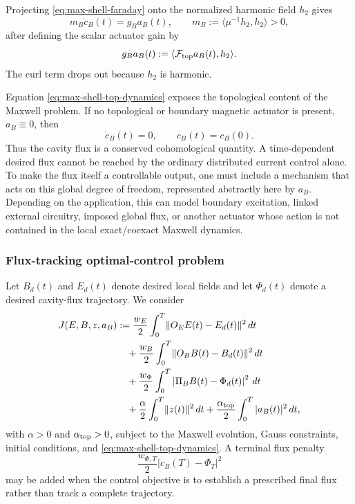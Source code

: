 \documentclass{article}
\newcommand{\ip}[2]{\langle #1,#2\rangle}
\newcommand{\norm}[1]{\lVert #1\rVert}
\begin{document}
Projecting \eqref{eq:max-shell-faraday} onto the normalized harmonic
field $h_2$ gives
\begin{equation}
  m_B \dot c_B(t)
  =
  g_B a_B(t),
  \qquad
  m_B:=\ip{\mu^{-1}h_2}{h_2}>0,
  \label{eq:max-shell-top-dynamics}
\end{equation}
after defining the scalar actuator gain by
\[
  g_B a_B(t)
  :=
  \langle\mathcal F_{\rm top}a_B(t),h_2\rangle.
\]
The curl term drops out because $h_2$ is harmonic.

Equation \eqref{eq:max-shell-top-dynamics} exposes the topological
content of the Maxwell problem.  If no topological or boundary
magnetic actuator is present, $a_B\equiv0$, then
\begin{equation}
  \dot c_B(t)=0,
  \qquad
  c_B(t)=c_B(0).
\end{equation}
Thus the cavity flux is a conserved cohomological quantity.  A
time-dependent desired flux cannot be reached by the ordinary
distributed current control alone.  To make the flux itself a
controllable output, one must include a mechanism that acts on this
global degree of freedom, represented abstractly here by $a_B$.
Depending on the application, this can model boundary excitation,
linked external circuitry, imposed global flux, or another actuator
whose action is not contained in the local exact/coexact Maxwell
dynamics.

\subsubsection{Flux-tracking optimal-control problem}

Let $B_d(t)$ and $E_d(t)$ denote desired local fields and let
$\Phi_d(t)$ denote a desired cavity-flux trajectory.  We consider
\begin{equation}
\begin{aligned}
  J(E,B,z,a_B)
  &:=
  \frac{w_E}{2}
  \int_0^T
  \norm{O_EE(t)-E_d(t)}^2\,dt
  \\
  &\quad+
  \frac{w_B}{2}
  \int_0^T
  \norm{O_BB(t)-B_d(t)}^2\,dt
  \\
  &\quad+
  \frac{w_\Phi}{2}
  \int_0^T
  \left|
    \Pi_B B(t)-\Phi_d(t)
  \right|^2\,dt
  \\
  &\quad+
  \frac{\alpha}{2}
  \int_0^T\norm{z(t)}^2\,dt
  +
  \frac{\alpha_{\rm top}}{2}
  \int_0^T|a_B(t)|^2\,dt,
\end{aligned}
\end{equation}
with $\alpha>0$ and $\alpha_{\rm top}>0$, subject to the Maxwell
evolution, Gauss constraints, initial conditions, and
\eqref{eq:max-shell-top-dynamics}.  A terminal flux penalty
\begin{equation}
  \frac{w_{\Phi,T}}{2}
  |c_B(T)-\Phi_T|^2
  \label{eq:max-shell-terminal-flux}
\end{equation}
may be added when the control objective is to establish a prescribed
final flux rather than track a complete trajectory.
\end{document}
